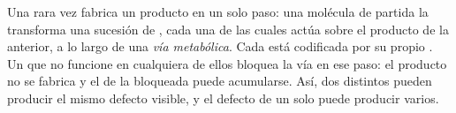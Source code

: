 \begin{proposition}\label{prop:g11:enzymes-and-phenotype:pathway}
Una  rara vez fabrica un producto en un solo paso: una molécula
de partida la transforma una sucesión de , cada una de las
cuales actúa sobre el producto de la anterior, a lo largo de una
\emph{vía metabólica}. Cada  está
codificada por su propio . Un  que no funcione en cualquiera de
ellos bloquea la vía en ese paso: el producto no se fabrica y el
 de la  bloqueada puede acumularse. Así, dos 
distintos pueden producir el mismo defecto visible, y el defecto de un
solo  puede producir varios.
\end{proposition}
\admitted

